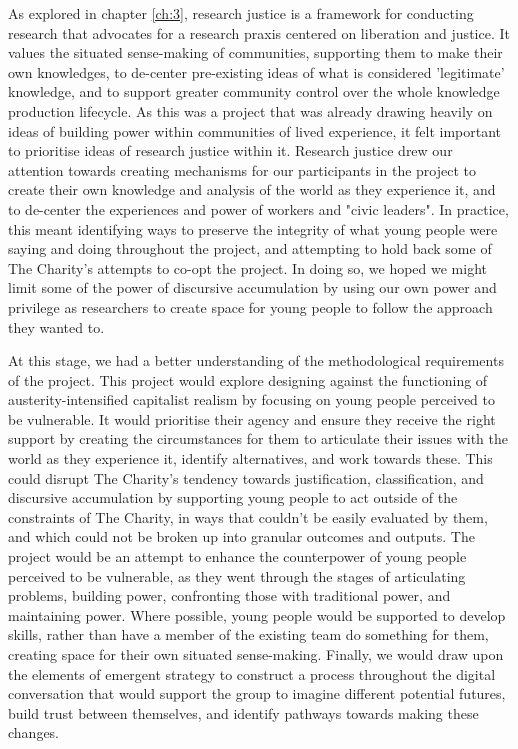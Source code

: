 As explored in chapter \ref{ch:3}, research justice is a framework for conducting research that advocates for a research praxis centered on liberation and justice. It values the situated sense-making of communities, supporting them to make their own knowledges, to de-center pre-existing ideas of what is considered 'legitimate' knowledge, and to support greater community control over the whole knowledge production lifecycle. As this was a project that was already drawing heavily on ideas of building power within communities of lived experience, it felt important to prioritise ideas of research justice within it. Research justice drew our attention towards creating mechanisms for our participants in the project to create their own knowledge and analysis of the world as they experience it, and to de-center the experiences and power of workers and "civic leaders". In practice, this meant identifying ways to preserve the integrity of what young people were saying and doing throughout the project, and attempting to hold back some of The Charity's attempts to co-opt the project. In doing so, we hoped we might limit some of the power of discursive accumulation by using our own power and privilege as researchers to create space for young people to follow the approach they wanted to.

At this stage, we had a better understanding of the methodological requirements of the project. This project would explore designing against the functioning of austerity-intensified capitalist realism by focusing on young people perceived to be vulnerable. It would prioritise their agency and ensure they receive the right support by creating the circumstances for them to articulate their issues with the world as they experience it, identify alternatives, and work towards these. This could disrupt The Charity's tendency towards justification, classification, and discursive accumulation by supporting young people to act outside of the constraints of The Charity, in ways that couldn't be easily evaluated by them, and which could not be broken up into granular outcomes and outputs. The project would be an attempt to enhance the counterpower of young people perceived to be vulnerable, as they went through the stages of articulating problems, building power, confronting those with traditional power, and maintaining power. Where possible, young people would be supported to develop skills, rather than have a member of the existing team do something for them, creating space for their own situated sense-making. Finally, we would draw upon the elements of emergent strategy to construct a process throughout the digital conversation that would support the group to imagine different potential futures, build trust between themselves, and identify pathways towards making these changes.  

